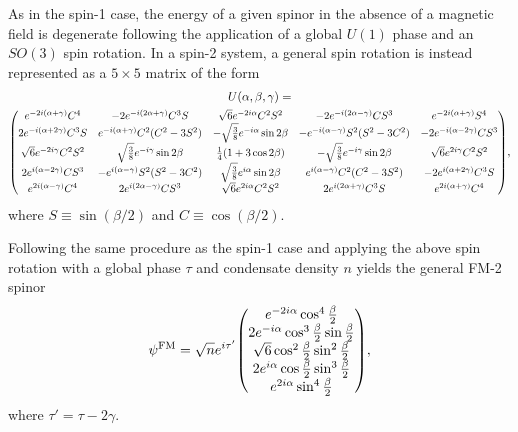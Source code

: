 As in the spin-1 case, the energy of a given spinor in the absence of a magnetic
field is degenerate following the application of a global \(U(1)\) phase and an
\(SO(3)\) spin rotation.
In a spin-2 system, a general spin rotation is instead represented as a
\(5\times 5\) matrix of the form
\begin{multline}\label{eq: spin-2-rotation-matrix}
    U(\alpha, \beta, \gamma) = \\
    \scalemath{0.90}{\mqty(
    e^{-2i(\alpha + \gamma)}C^4 & -2e^{-i(2\alpha+\gamma)}C^3S
    & \sqrt{6}e^{-2i\alpha}C^2S^2 & -2e^{-i(2\alpha-\gamma)}CS^3
    & e^{-2i(\alpha + \gamma)}S^4
    \\
    2e^{-i(\alpha+2\gamma)}C^3S & e^{-i(\alpha+\gamma)}C^2(C^2-3S^2)
    & -\sqrt{\frac{3}{8}}e^{-i\alpha}\sin 2\beta
    & -e^{-i(\alpha-\gamma)}S^2(S^2-3C^2) & -2e^{-i(\alpha-2\gamma)}CS^3
    \\
    \sqrt{6}e^{-2i\gamma}C^2S^2 & \sqrt{\frac{3}{8}}e^{-i\gamma}\sin 2\beta
    & \frac{1}{4}(1+3\cos 2\beta)
    & -\sqrt{\frac{3}{8}}e^{-i\gamma}\sin 2\beta
    & \sqrt{6}e^{2i\gamma}C^2S^2
    \\
    2e^{i(\alpha-2\gamma)}CS^3 & -e^{i(\alpha-\gamma)}S^2(S^2-3C^2)
    & \sqrt{\frac{3}{8}}e^{i\alpha}\sin 2\beta
    & e^{i(\alpha-\gamma)}C^2(C^2-3S^2) & -2e^{i(\alpha+2\gamma)}C^3S
    \\
    e^{2i(\alpha - \gamma)}C^4 & 2e^{i(2\alpha-\gamma)}CS^3
    & \sqrt{6}e^{2i\alpha}C^2S^2 & 2e^{i(2\alpha+\gamma)}C^3S
    & e^{2i(\alpha + \gamma)}C^4
    )},
\end{multline}
where \(S \equiv \sin(\beta/2)\) and \(C \equiv \cos(\beta/2)\).

Following the same procedure as the spin-1 case and applying the above spin
rotation with a global phase \(\tau \) and condensate density \(n\) yields the
general FM-2 spinor
\begin{equation}\label{eq: FM-2-representative-spinor}
    \psi^\mathrm{FM} = \sqrt{n}e^{i\tau'}\mqty(
    e^{-2i\alpha} \cos^4\frac{\beta}{2} \\
    2e^{-i\alpha}\cos^3\frac{\beta}{2}\sin \frac{\beta}{2} \\
    \sqrt{6} \cos^2\frac{\beta}{2} \sin^2\frac{\beta}{2} \\
    2e^{i\alpha}\cos\frac{\beta}{2} \sin^3\frac{\beta}{2} \\
    e^{2i\alpha} \sin^4\frac{\beta}{2}
    ),
\end{equation}
where \(\tau'=\tau-2\gamma \).

